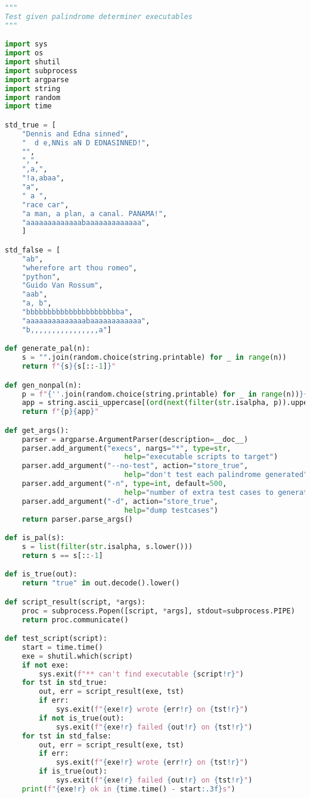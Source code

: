 \documentclass[fleqn,a4paper,11pt]{article}
\begin{document}
\begin{lstlisting}[language=Python, caption=Testing script]
"""
Test given palindrome determiner executables
"""

import sys
import os
import shutil
import subprocess
import argparse
import string
import random
import time

std_true = [
    "Dennis and Edna sinned",
    "  d e,NNis aN D EDNASINNED!",
    "",
    ",",
    ",a,",
    "!a,abaa",
    "a",
    " a ",
    "race car",
    "a man, a plan, a canal. PANAMA!",
    "aaaaaaaaaaaaabaaaaaaaaaaaaa",
    ]

std_false = [
    "ab",
    "wherefore art thou romeo",
    "python",
    "Guido Van Rossum",
    "aab",
    "a, b",
    "bbbbbbbbbbbbbbbbbbbbbba",
    "aaaaaaaaaaaaaabaaaaaaaaaaaa",
    "b,,,,,,,,,,,,,,,,a"]

def generate_pal(n):
    s = "".join(random.choice(string.printable) for _ in range(n))
    return f"{s}{s[::-1]}"

def gen_nonpal(n):
    p = f"{''.join(random.choice(string.printable) for _ in range(n))}{random.choice(string.ascii_letters)}"
    app = string.ascii_uppercase[(ord(next(filter(str.isalpha, p)).upper()) - 65 + 13) % 26]
    return f"{p}{app}"

def get_args():
    parser = argparse.ArgumentParser(description=__doc__)
    parser.add_argument("execs", nargs="*", type=str,
                            help="executable scripts to target")
    parser.add_argument("--no-test", action="store_true",
                            help="don't test each palindrome generated")
    parser.add_argument("-n", type=int, default=500,
                            help="number of extra test cases to generate for both true and false")
    parser.add_argument("-d", action="store_true",
                            help="dump testcases")
    return parser.parse_args()

def is_pal(s):
    s = list(filter(str.isalpha, s.lower()))
    return s == s[::-1]

def is_true(out):
    return "true" in out.decode().lower()

def script_result(script, *args):
    proc = subprocess.Popen([script, *args], stdout=subprocess.PIPE)
    return proc.communicate()

def test_script(script):
    start = time.time()
    exe = shutil.which(script)
    if not exe:
        sys.exit(f"** can't find executable {script!r}")
    for tst in std_true:
        out, err = script_result(exe, tst)
        if err:
            sys.exit(f"{exe!r} wrote {err!r} on {tst!r}")
        if not is_true(out):
            sys.exit(f"{exe!r} failed {out!r} on {tst!r}")
    for tst in std_false:
        out, err = script_result(exe, tst)
        if err:
            sys.exit(f"{exe!r} wrote {err!r} on {tst!r}")
        if is_true(out):
            sys.exit(f"{exe!r} failed {out!r} on {tst!r}")
    print(f"{exe!r} ok in {time.time() - start:.3f}s")


\end{lstlisting}
\end{document}
